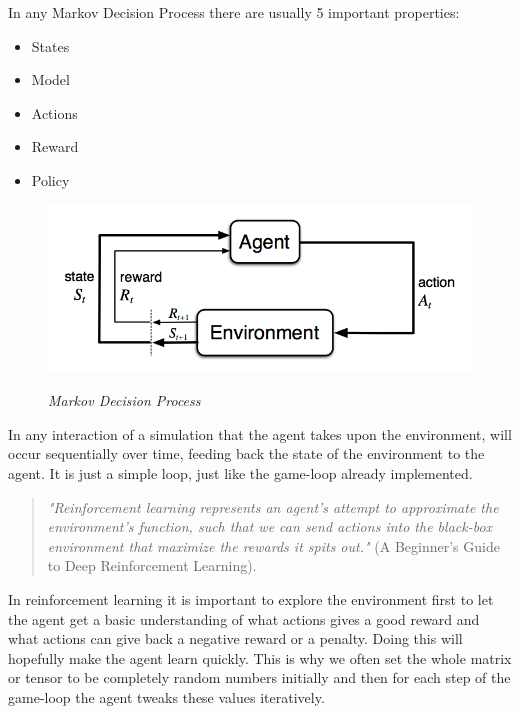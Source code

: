 \documentclass[
a4paper,
11pt,
english
]{report}
\newenvironment{myitemize}{
    \begin{itemize}
    \setlength{\itemsep}{0pt}
    \setlength{\parskip}{0pt}
    \setlength{\parsep}{0pt}
}{\end{itemize}}
\begin{document}
In any Markov Decision Process there are usually 5 important properties:

\begin{myitemize}
    \item States
    \item Model
    \item Actions
    \item Reward
    \item Policy
\end{myitemize}

\begin{figure}[h]
    \centering
    \includegraphics[width=.65\textwidth]{markov_decision_process}
    \label{fig:markov_decision_process}
    \caption{\textit{Markov Decision Process}}
\end{figure}

In any interaction of a simulation that the agent takes upon the environment, will occur sequentially over time, feeding back the state of the environment to the agent. It is just a simple loop, just like the game-loop already implemented.

\begin{quote}
    \textit{"Reinforcement learning represents an agent’s attempt to approximate the environment’s function, such that we can send actions into the black-box environment that maximize the rewards it spits out."} (A Beginner's Guide to Deep Reinforcement Learning).
\end{quote}

In reinforcement learning it is important to explore the environment first to let the agent get a basic understanding of what actions gives a good reward and what actions can give back a negative reward or a penalty. Doing this will hopefully make the agent learn quickly. This is why we often set the whole matrix or tensor to be completely random numbers initially and then for each step of the game-loop the agent tweaks these values iteratively.
\end{document}

